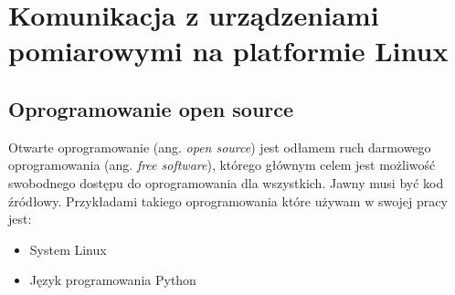 \chapter{Komunikacja z urządzeniami pomiarowymi na platformie Linux}
\section{Oprogramowanie open source}
Otwarte oprogramowanie (ang. \textit{open source}) jest odłamem ruch darmowego oprogramowania (ang. \textit{free software}), którego głównym celem jest możliwość swobodnego dostępu do oprogramowania dla wszystkich. Jawny musi być kod źródłowy. Przykładami takiego oprogramowania które używam w swojej pracy jest:
\begin{itemize}
\item System Linux
\item Język programowania Python
\end{itemize}
